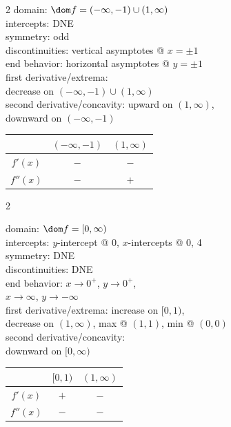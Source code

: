 \documentclass{book}
\begin{document}
\begin{appendices}
\begin{enumerate}[!HW!]
\begin{multicols}{2}
domain: $\dom f = (-\infty, -1)\cup (1,\infty)$ \\
intercepts: DNE\\
symmetry: odd \\ 
discontinuities: vertical asymptotes @ $x=\pm1$\\
end behavior: horizontal asymptotes @ $y=\pm1$\\
first derivative/extrema:\\ decrease on $(-\infty,-1)\cup(1,\infty)$\\
second derivative/concavity: upward on $(1,\infty)$,\\ downward on $(-\infty,-1)$\vspace{-15pt}
\begin{center}
\begin{tabular}{c|c|c}
 & $(-\infty, -1)$ &  $(1,\infty)$ \\ \hline
$f'(x)$ & $-$ & $-$ \\ 
$f''(x)$ & $-$ & $+$ \\ 
\end{tabular}
\end{center}
\end{multicols}\pagebreak

\itemspade \mbox{}\vspace{-25pt}

\begin{multicols}{2}
\columnbreak
 
domain: $\dom f = [0,\infty)$ \\
intercepts: $y$-intercept @ 0, $x$-intercepts @ 0, 4\\
symmetry: DNE \\ 
discontinuities: DNE\\
end behavior: $x\to0^+$, $y\to 0^+$, \\ $x\to \infty$, $y\to-\infty$\\
first derivative/extrema: increase on $[0,1)$,\\ decrease on $(1,\infty)$, max @ $(1,1)$, min @ $(0,0)$\\
second derivative/concavity:\\ downward on $[0,\infty)$
\begin{center}
\begin{tabular}{c|c|c}
 & $[0, 1)$ &  $(1,\infty)$ \\ \hline
$f'(x)$ & $+$ & $-$ \\ 
$f''(x)$ & $-$ & $-$ \\ 
\end{tabular}
\end{center}
\end{multicols}


\end{enumerate}
\end{appendices}
\end{document}
